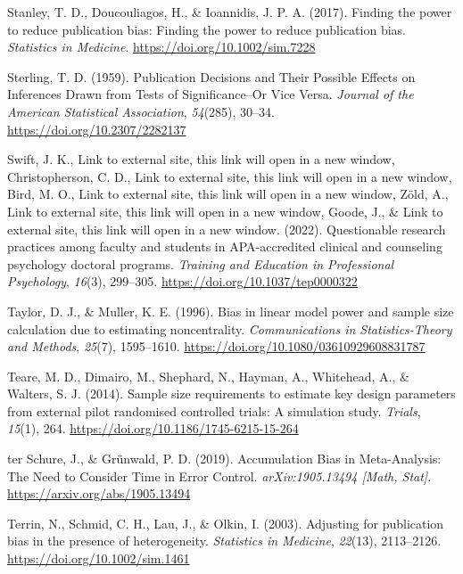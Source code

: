 \documentclass[
  letterpaper,
  DIV=11,
  numbers=noendperiod]{scrreprt}
\newlength{\cslhangindent}
\newlength{\cslentryspacingunit} %
\newenvironment{CSLReferences}[2] %
 {%
  \setlength{\parindent}{0pt}
  \ifodd #1
  \let\oldpar\par
  \def\par{\hangindent=\cslhangindent\oldpar}
  \fi
  \setlength{\parskip}{#2\cslentryspacingunit}
 }%
 {}
\begin{document}
\begin{CSLReferences}{1}{0}
\leavevmode{}%
Stanley, T. D., Doucouliagos, H., \& Ioannidis, J. P. A. (2017). Finding
the power to reduce publication bias: {Finding} the power to reduce
publication bias. \emph{Statistics in Medicine}.
\url{https://doi.org/10.1002/sim.7228}

\leavevmode{}%
Sterling, T. D. (1959). Publication {Decisions} and {Their Possible
Effects} on {Inferences Drawn} from {Tests} of {Significance--Or Vice
Versa}. \emph{Journal of the American Statistical Association},
\emph{54}(285), 30--34. \url{https://doi.org/10.2307/2282137}

\leavevmode{}%
Swift, J. K., Link to external site, this link will open in a new
window, Christopherson, C. D., Link to external site, this link will
open in a new window, Bird, M. O., Link to external site, this link will
open in a new window, Zöld, A., Link to external site, this link will
open in a new window, Goode, J., \& Link to external site, this link
will open in a new window. (2022). Questionable research practices among
faculty and students in {APA-accredited} clinical and counseling
psychology doctoral programs. \emph{Training and Education in
Professional Psychology}, \emph{16}(3), 299--305.
\url{https://doi.org/10.1037/tep0000322}

\leavevmode{}%
Taylor, D. J., \& Muller, K. E. (1996). Bias in linear model power and
sample size calculation due to estimating noncentrality.
\emph{Communications in Statistics-Theory and Methods}, \emph{25}(7),
1595--1610. \url{https://doi.org/10.1080/03610929608831787}

\leavevmode{}%
Teare, M. D., Dimairo, M., Shephard, N., Hayman, A., Whitehead, A., \&
Walters, S. J. (2014). Sample size requirements to estimate key design
parameters from external pilot randomised controlled trials: A
simulation study. \emph{Trials}, \emph{15}(1), 264.
\url{https://doi.org/10.1186/1745-6215-15-264}

\leavevmode{}%
ter Schure, J., \& Grünwald, P. D. (2019). Accumulation {Bias} in
{Meta-Analysis}: {The Need} to {Consider Time} in {Error Control}.
\emph{arXiv:1905.13494 {[}Math, Stat{]}}.
\url{https://arxiv.org/abs/1905.13494}

\leavevmode{}%
Terrin, N., Schmid, C. H., Lau, J., \& Olkin, I. (2003). Adjusting for
publication bias in the presence of heterogeneity. \emph{Statistics in
Medicine}, \emph{22}(13), 2113--2126.
\url{https://doi.org/10.1002/sim.1461}


\end{CSLReferences}
\end{document}
